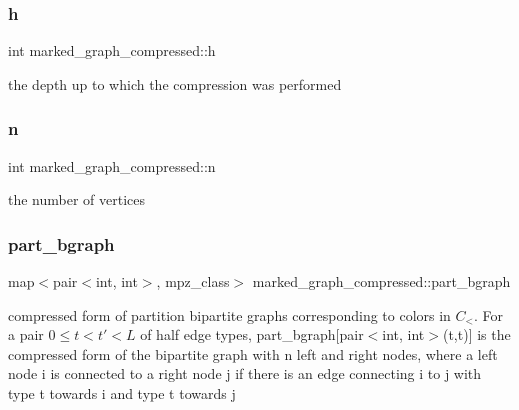\mbox{\label{classmarked__graph__compressed_af6ff623407b673d08d0cab77b39c2193}} 
\subsubsection{\texorpdfstring{h}{h}}
{\footnotesize\ttfamily int marked\+\_\+graph\+\_\+compressed\+::h}



the depth up to which the compression was performed 

\mbox{\label{classmarked__graph__compressed_a8d841016ddb11cfd33748c8deb6277ba}} 
\subsubsection{\texorpdfstring{n}{n}}
{\footnotesize\ttfamily int marked\+\_\+graph\+\_\+compressed\+::n}



the number of vertices 

\mbox{\label{classmarked__graph__compressed_a7b3267063fba30b45eb21b3ba4e07536}} 
\subsubsection{\texorpdfstring{part\+\_\+bgraph}{part\_bgraph}}
{\footnotesize\ttfamily map$<$pair$<$int, int$>$, mpz\+\_\+class$>$ marked\+\_\+graph\+\_\+compressed\+::part\+\_\+bgraph}



compressed form of partition bipartite graphs corresponding to colors in $C_<$. For a pair $0 \leq t < t' < L$ of half edge types, part\+\_\+bgraph\mbox{[}pair$<$int, int$>$(t,t\textquotesingle{})\mbox{]} is the compressed form of the bipartite graph with n left and right nodes, where a left node i is connected to a right node j if there is an edge connecting i to j with type t towards i and type t\textquotesingle{} towards j 

